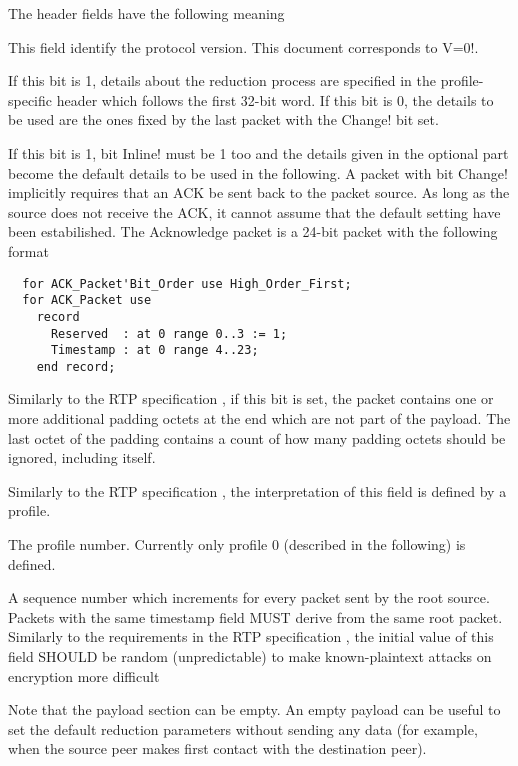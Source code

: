\documentclass{rfc}
\begin{document}
The header fields have the following meaning

\begin{description}
\label{description:4.0.0;transport_layer}
\item[Version (V): 2 bit]
This field identify the protocol version.  This document
corresponds to \ttt V=0!.
\item[Inline  (I): 1 bit]
If this bit is 1, details about the reduction process are specified in
the profile-specific header which follows the first 32-bit word.  If
this bit is 0, the details to be used are the ones fixed by the last
packet with the \ttt Change! bit set.
\item[Change  (C): 1 bit]
If this bit is 1, bit \ttt Inline! must be 1 too and the details given
in the optional part become the default details to be used in the
following.  A packet with bit \ttt Change! implicitly requires that an
ACK be sent back to the packet source.  As long as the source does not
receive the ACK, it cannot assume that the default setting have been
estabilished.   The Acknowledge packet is a 24-bit packet with the
following format

\begin{verbatim}
  for ACK_Packet'Bit_Order use High_Order_First;
  for ACK_Packet use
    record
      Reserved  : at 0 range 0..3 := 1; 
      Timestamp : at 0 range 4..23;
    end record; 
\end{verbatim}

\item[Padding (P): 1 bit] Similarly to the RTP specification
\cite{rfc3550}, if this bit is set, the packet contains one or more
additional padding octets at the end which are not part of the
payload.  The last octet of the padding contains a count of how many
padding octets should be ignored, including itself.
\item[Marker (M): 3 bit] Similarly to the RTP
specification \cite{rfc3550}, the interpretation of this field is defined by a
profile.
\item[Profile    : 4 bit] The profile number.  Currently only profile
  0 (described in the following) is defined.
\item[Timestamp : 20 bit] A sequence number which increments for every
  packet sent by the root source. Packets with the same timestamp
  field MUST derive from the same root packet.\\
  Similarly to the requirements in the RTP specification \cite{rfc3550}, the
  initial value of this field SHOULD be random (unpredictable) to make
  known-plaintext attacks on encryption more difficult
\end{description}
%
Note that the payload section can be empty.  An empty payload can be
useful to set the default reduction parameters without sending any
data (for example, when the source peer makes first contact with the
destination peer).
\end{document}
